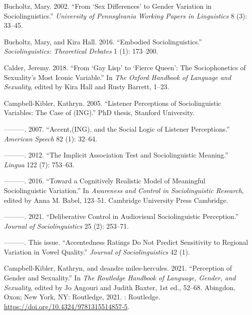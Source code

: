 \documentclass[
  letterpaper,
  DIV=11,
  numbers=noendperiod]{scrartcl}
\newlength{\cslhangindent}
\newenvironment{CSLReferences}[2] %
 {\begin{list}{}{%
  \setlength{\itemindent}{0pt}
  \setlength{\leftmargin}{0pt}
  \setlength{\parsep}{0pt}
  \ifodd #1
   \setlength{\leftmargin}{\cslhangindent}
   \setlength{\itemindent}{-1\cslhangindent}
  \fi
  \setlength{\itemsep}{#2\baselineskip}}}
 {\end{list}}
\begin{document}
\begin{CSLReferences}{1}{0}
Bucholtz, Mary. 2002. {``From {`Sex Differences'} to Gender Variation in
Sociolinguistics.''} \emph{University of Pennsylvania Working Papers in
Linguistics} 8 (3): 33--45.

Bucholtz, Mary, and Kira Hall. 2016. {``Embodied Sociolinguistics.''}
\emph{Sociolinguistics: Theoretical Debates} 1 (1): 173--200.

Calder, Jeremy. 2018. {``From {`Gay Lisp'} to {`Fierce Queen'}: The
Sociophonetics of Sexuality's Most Iconic Variable.''} In \emph{The
Oxford Handbook of Language and Sexuality}, edited by Kira Hall and
Rusty Barrett, 1--23.

Campbell-Kibler, Kathryn. 2005. {``Listener Perceptions of
Sociolinguistic Variables: The Case of (ING).''} PhD thesis, Stanford
University.

---------. 2007. {``Accent,(ING), and the Social Logic of Listener
Perceptions.''} \emph{American Speech} 82 (1): 32--64.

---------. 2012. {``The Implicit Association Test and Sociolinguistic
Meaning.''} \emph{Lingua} 122 (7): 753--63.

---------. 2016. {``Toward a Cognitively Realistic Model of Meaningful
Sociolinguistic Variation.''} In \emph{Awareness and Control in
Sociolinguistic Research}, edited by Anna M. Babel, 123--51. Cambridge
University Press Cambridge.

---------. 2021. {``Deliberative Control in Audiovisual Sociolinguistic
Perception.''} \emph{Journal of Sociolinguistics} 25 (2): 253--71.

---------. This issue. {``Accentedness Ratings Do Not Predict
Sensitivity to Regional Variation in Vowel Quality.''} \emph{Journal of
Sociolinguistics} 42 (1).

Campbell-Kibler, Kathryn, and deandre miles-hercules. 2021.
{``Perception of Gender and Sexuality.''} In \emph{The {Routledge}
{Handbook} of {Language}, {Gender}, and {Sexuality}}, edited by Jo
Angouri and Judith Baxter, 1st ed., 52--68. Abingdon, Oxon; New York,
NY: Routledge, 2021. {\textbar}: Routledge.
\url{https://doi.org/10.4324/9781315514857-5}.


\end{CSLReferences}
\end{document}
